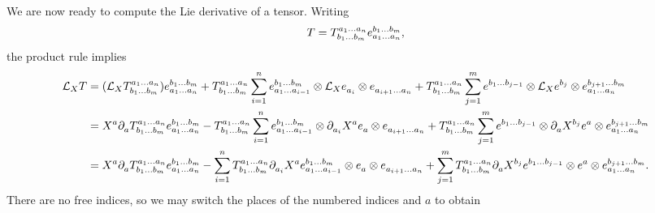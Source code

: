 We are now ready to compute the Lie derivative of a tensor. Writing
\begin{align*}
	T = \tensor*{T}{^{a_{1}\dots a_{n}}_{b_{1}\dots b_{m}}}\tensor*{e}{^{b_{1}\dots b_{m}}_{a_{1}\dots a_{n}}},
\end{align*}
the product rule implies
\begin{align*}
	\lied{X}{T} &= (\lied{X}{\tensor*{T}{^{a_{1}\dots a_{n}}_{b_{1}\dots b_{m}}}})\tensor*{e}{^{b_{1}\dots b_{m}}_{a_{1}\dots a_{n}}} + \tensor*{T}{^{a_{1}\dots a_{n}}_{b_{1}\dots b_{m}}}\sum\limits_{i = 1}^{n}\tensor*{e}{^{b_{1}\dots b_{m}}_{a_{1}\dots a_{i - 1}}}\otimes\lied{X}{\tensor*{e}{_{a_{i}}}}\otimes\tensor*{e}{_{a_{i + 1}\dots a_{n}}} + \tensor*{T}{^{a_{1}\dots a_{n}}_{b_{1}\dots b_{m}}}\sum\limits_{j = 1}^{m}\tensor*{e}{^{b_{1}\dots b_{j - 1}}}\otimes\lied{X}{\tensor*{e}{^{b_{j}}}}\otimes\tensor*{e}{^{b_{j + 1}\dots b_{m}}_{a_{1}\dots a_{n}}} \\
	            &= X^{a}\del{}{a}{\tensor*{T}{^{a_{1}\dots a_{n}}_{b_{1}\dots b_{m}}}}\tensor*{e}{^{b_{1}\dots b_{m}}_{a_{1}\dots a_{n}}} - \tensor*{T}{^{a_{1}\dots a_{n}}_{b_{1}\dots b_{m}}}\sum\limits_{i = 1}^{n}\tensor*{e}{^{b_{1}\dots b_{m}}_{a_{1}\dots a_{i - 1}}}\otimes \del{}{a_{i}}{X^{a}}\tensor*{e}{_{a}}\otimes\tensor*{e}{_{a_{i + 1}\dots a_{n}}} + \tensor*{T}{^{a_{1}\dots a_{n}}_{b_{1}\dots b_{m}}}\sum\limits_{j = 1}^{m}\tensor*{e}{^{b_{1}\dots b_{j - 1}}}\otimes \del{}{a}{X^{b_{j}}}\tensor*{e}{^{a}}\otimes\tensor*{e}{^{b_{j + 1}\dots b_{m}}_{a_{1}\dots a_{n}}} \\
	            &= X^{a}\del{}{a}{\tensor*{T}{^{a_{1}\dots a_{n}}_{b_{1}\dots b_{m}}}}\tensor*{e}{^{b_{1}\dots b_{m}}_{a_{1}\dots a_{n}}} - \sum\limits_{i = 1}^{n}\tensor*{T}{^{a_{1}\dots a_{n}}_{b_{1}\dots b_{m}}}\del{}{a_{i}}{X^{a}}\tensor*{e}{^{b_{1}\dots b_{m}}_{a_{1}\dots a_{i - 1}}}\otimes\tensor*{e}{_{a}}\otimes\tensor*{e}{_{a_{i + 1}\dots a_{n}}} + \sum\limits_{j = 1}^{m}\tensor*{T}{^{a_{1}\dots a_{n}}_{b_{1}\dots b_{m}}}\del{}{a}{X^{b_{j}}}\tensor*{e}{^{b_{1}\dots b_{j - 1}}}\otimes\tensor*{e}{^{a}}\otimes\tensor*{e}{^{b_{j + 1}\dots b_{m}}_{a_{1}\dots a_{n}}}.
\end{align*}
There are no free indices, so we may switch the places of the numbered indices and $a$ to obtain
